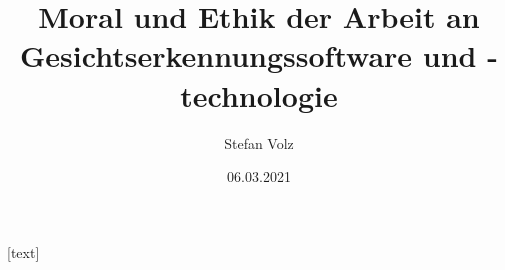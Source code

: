 

\usepackage[german]{babel}
\usepackage{newunicodechar}
\usepackage[utf8]{inputenc}

\usepackage{subcaption}
\usepackage{adjustbox}
\usepackage{booktabs}
\usepackage[scale=2]{ccicons}

\usepackage{algorithm}
\usepackage[noend]{algpseudocode}
\makeatletter
\def\BState{\State\hskip-\ALG@thistlm}
\makeatother
%

\usepackage{multirow}
\usepackage[none]{hyphenat}
\usepackage{textcomp}
\usepackage{gensymb}
\sloppy


\usepackage{pgfplots}

\usepackage{xspace}
\newcommand{\themename}{\textbf{\textsc{metropolis}}\xspace}

\usepackage{graphicx}
\graphicspath{ {./img/} }

\usepackage{fancyhdr}

\usepackage[backend=biber, style=alphabetic]{biblatex}

[text] %

\usepackage{csquotes}
\usepackage{epigraph}


\title{Moral und Ethik der Arbeit an Gesichtserkennungssoftware und -technologie }
\subtitle{}
\date{06.03.2021}
\author{Stefan Volz}


\newcommand{\nologo}{\setbeamertemplate{logo}{}} %
\newcommand{\congress}{Gesichtserkennung}

\newcommand{\sourceCaption}[2]{{\caption*{\tiny{Quelle: #1}}\vspace*{-.5cm}
      \caption{#2}}}

\captionsetup[figure]{labelformat=empty}%


